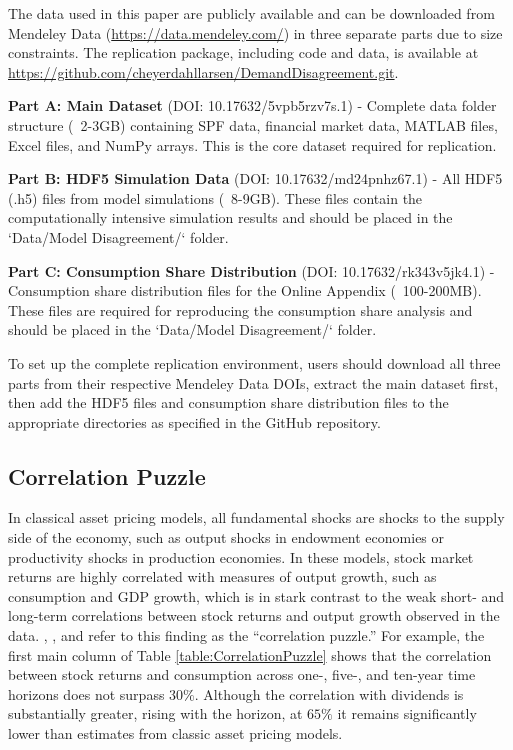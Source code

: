 \documentclass[preprint,11pt,authoryear]{elsarticle}
\theoremstyle{plain}
\begin{document}
The data used in this paper are publicly available and can be downloaded from Mendeley Data (\url{https://data.mendeley.com/}) in three separate parts due to size constraints. The replication package, including code and data, is available at \url{https://github.com/cheyerdahllarsen/DemandDisagreement.git}.

\textbf{Part A: Main Dataset} (DOI: 10.17632/5vpb5rzv7s.1) - Complete data folder structure (~2-3GB) containing SPF data, financial market data, MATLAB files, Excel files, and NumPy arrays. This is the core dataset required for replication.

\textbf{Part B: HDF5 Simulation Data} (DOI: 10.17632/md24pnhz67.1) - All HDF5 (.h5) files from model simulations (~8-9GB). These files contain the computationally intensive simulation results and should be placed in the `Data/Model Disagreement/` folder.

\textbf{Part C: Consumption Share Distribution} (DOI: 10.17632/rk343v5jk4.1) - Consumption share distribution files for the Online Appendix (~100-200MB). These files are required for reproducing the consumption share analysis and should be placed in the `Data/Model Disagreement/` folder.

To set up the complete replication environment, users should download all three parts from their respective Mendeley Data DOIs, extract the main dataset first, then add the HDF5 files and consumption share distribution files to the appropriate directories as specified in the GitHub repository.

\subsection{Correlation Puzzle}

In classical asset pricing models, all fundamental shocks
 are shocks to the supply side of the economy, such as output shocks in \cite{Lucas1978} endowment economies or productivity shocks in \cite{Jermann1998} production economies. In these models, stock market returns are highly correlated with measures of output growth, such as consumption and GDP growth, which is in stark contrast to the weak short- and long-term correlations between stock returns and output growth observed in the data. \cite{CochraneHansen1992}, \cite{campbell-cochrane:99}, and \cite{Cochrane2005} refer to this finding as the ``correlation puzzle.'' For example, the first main column of Table \ref{table:CorrelationPuzzle} shows that the correlation between stock returns and consumption across one-, five-, and ten-year time horizons does not surpass $30\%$. Although the correlation with dividends is substantially greater, rising with the horizon, at $65\%$ it remains significantly lower than estimates from classic asset pricing models. 
 
\end{document}
